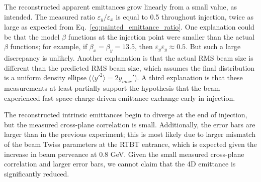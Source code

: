 %
The reconstructed apparent emittances grow linearly from a small value, as intended. The measured ratio $\varepsilon_y / \varepsilon_x$ is equal to 0.5 throughout injection, twice as large as expected from Eq.~\ref{eq:painted_emittance_ratio}. One explanation could be that the model $\beta$ functions at the injection point were smaller than the actual $\beta$ functions; for example, if $\beta_x = \beta_y = 13.5$, then $\varepsilon_y \varepsilon_y \approx 0.5$. But such a large discrepancy is unlikely. Another explanation is that the actual RMS beam size is different than the predicted RMS beam size, which assumes the final distribution is a uniform density ellipse ($\langle{y'^2}\rangle = 2 y_{max}'$). A third explanation is that these measurements at least partially support the hypothesis that the beam experienced fast space-charge-driven emittance exchange early in injection. 

The reconstructed intrinsic emittances begin to diverge at the end of injection, but the measured cross-plane correlation is small. Additionally, the error bars are larger than in the previous experiment; this is most likely due to larger mismatch of the beam Twiss parameters at the RTBT entrance, which is expected given the increase in beam perveance at 0.8 GeV. Given the small measured cross-plane correlation and larger error bars, we cannot claim that the 4D emittance is significantly reduced. 

